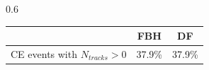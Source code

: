 \documentclass{beamer}
\begin{document}
\begin{frame}
\begin{columns}
\begin{column}{0.6\framewidth}
\begin{table}[h!]
        \label{tab:0bbpbar}
        \end{table}
        \vspace{-6mm}
        \begin{table}[h!]
    \centering
            \vspace{-1mm}
            \hspace*{-0.5em}
    \renewcommand{\arraystretch}{0.7}
    \begin{tabular}{| c | c | c |} 
    \hline
    & {\scriptsize FBH} & {\scriptsize DF}  \\
    \hline
    {\scriptsize CE events with $N_{tracks}>0$} & {\scriptsize 37.9\%} & {\scriptsize 37.9\%} \\
    \hline
    \end{tabular}
    \label{tab:2bbcele}
    \end{table}
  

\end{column}
\end{columns}
\end{frame}
\end{document}
